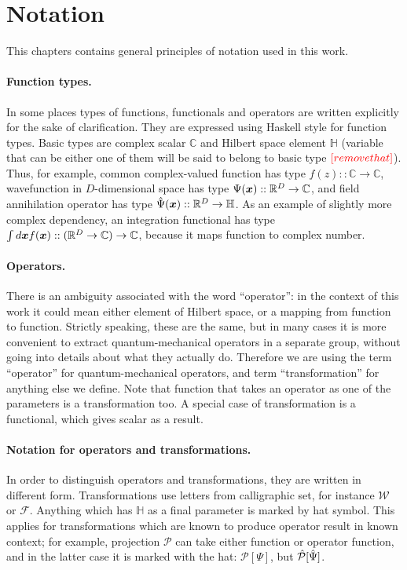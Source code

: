 \section{Notation}

This chapters contains general principles of notation used in this work.

\paragraph{Function types.}
In some places types of functions, functionals and operators are written explicitly for the sake of clarification.
They are expressed using Haskell style for function types.
Basic types are complex scalar $\mathbb{C}$ and Hilbert space element $\mathbb{H}$ (variable that can be either one of them will be said to belong to basic type $\textcolor{red}{[remove that]}$).
Thus, for example, common complex-valued function has type $f(z) :: \mathbb{C} \rightarrow \mathbb{C}$,
wavefunction in $D$-dimensional space has type $\Psi(\boldsymbol{x}) :: \mathbb{R}^D \rightarrow \mathbb{C}$,
and field annihilation operator has type $\hat{\Psi}(\boldsymbol{x}) :: \mathbb{R}^D \rightarrow \mathbb{H}$.
As an example of slightly more complex dependency,
an integration functional has type $\int d\boldsymbol{x} f(\boldsymbol{x}) :: (\mathbb{R}^D \rightarrow \mathbb{C}) \rightarrow \mathbb{C}$,
because it maps function to complex number.

\paragraph{Operators.}
There is an ambiguity associated with the word ``operator'':
in the context of this work it could mean either element of Hilbert space, or a mapping from function to function.
Strictly speaking, these are the same, but in many cases it is more convenient to extract quantum-mechanical operators in a separate group, without going into details about what they actually do.
Therefore we are using the term ``operator'' for quantum-mechanical operators,
and term ``transformation'' for anything else we define.
Note that function that takes an operator as one of the parameters is a transformation too.
A special case of transformation is a functional, which gives scalar as a result.

\paragraph{Notation for operators and transformations.}
In order to distinguish operators and transformations, they are written in different form.
Transformations use letters from calligraphic set, for instance $\mathcal{W}$ or $\mathcal{F}$.
Anything which has $\mathbb{H}$ as a final parameter is marked by hat symbol.
This applies for transformations which are known to produce operator result in known context;
for example, projection $\mathcal{P}$ can take either function or operator function,
and in the latter case it is marked with the hat: $\mathcal{P}[\Psi]$, but $\hat{\mathcal{P}}[\hat{\Psi}]$.

